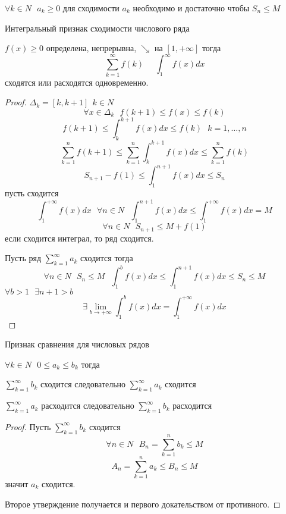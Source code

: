 \begin{block}[Критерий]
  $
  \forall k \in N ~~~
  a_k \ge 0
  $
  для сходимости $a_k$ необходимо и достаточно чтобы $S_n \le M$
\end{block}

\begin{title}[\Large]
  Интегральный признак сходимости числового ряда
\end{title}

\begin{block}
  $f(x) \ge 0$ определена, непрерывна, $\searrow$ на $[1, +\infty]$ тогда
  $$
  \sum_{k=1}^{\infty} f(k) ~~~~~~ \int_1^{\infty} f(x)dx
  $$
  сходятся или расходятся одновременно.
\end{block}

\begin{proof}
  $\Delta_k = [k, k+1] ~~ k \in N$
  $$
  \forall x \in \Delta_k ~~~ f(k+1) \le f(x) \le f(k)
  $$
  $$
  f(k+1) \le \int_k^{k+1} f(x)dx \le f(k) ~~~ k = 1, \ldots, n
  $$
  $$
  \sum_{k=1}^n f(k+1) \le \sum_{k=1}^n \int_k^{k+1} f(x)dx \le \sum_{k=1}^n f(k)
  $$
  $$
  S_{n+1} - f(1) \le \int_1^{n+1} f(x)dx \le S_n
  $$
  пусть сходится
  $$
  \int_1^{+\infty} f(x)dx ~~~ \forall n \in N ~~~
  \int_1^{n+1} f(x)dx \le \int_1^{+\infty} f(x) dx = M
  $$
  $$
  \forall n \in N ~~~ S_{n+1} \le M + f(1)
  $$
  если сходится интеграл, то ряд сходится.

  Пусть ряд $\sum_{k=1}^{\infty} a_k$ сходится тогда
  $$
  \forall n \in N ~~~
  S_n \le M ~~~
  \int_1^b f(x)dx \le \int_1^{n+1} f(x)dx \le S_n \le M
  $$
  $\forall b>1 ~~~ \exists n+1 > b$
  $$
  \exists \lim_{b \to +\infty} \int_1^b f(x)dx = \int_1^{+ \infty} f(x)dx
  $$
\end{proof}

\begin{title}[\Large]
  Признак сравнения для числовых рядов
\end{title}

\begin{block}
  $\forall k \in N ~~~ 0 \le a_k \le b_k$ тогда

  $\sum_{k=1}^{\infty} b_k$ сходится следовательно $\sum_{k=1}^{\infty} a_k$
  сходится

  $\sum_{k=1}^{\infty} a_k$ расходится следовательно $\sum_{k=1}^{\infty} b_k$
  расходится
\end{block}

\begin{proof}
  Пусть $\sum_{k=1}^{\infty} b_k$ сходится
  $$
  \forall n \in N ~~~ B_n = \sum_{k=1}^n b_k \le M
  $$
  $$
  A_n = \sum_{k=1}^n a_k \le B_n \le M
  $$
  значит $a_k$ сходится.

  Второе утверждение получается и первого докательством от противного.
\end{proof}

